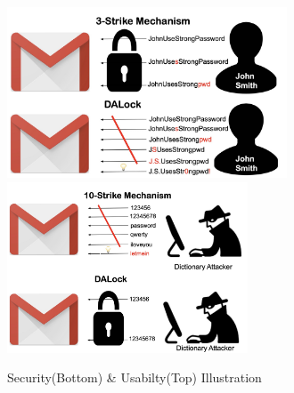 \vspace*{-\baselineskip}
\begin{figure}[htb]
	\begin{center}
		\includegraphics[height=2.0in,width=\linewidth]{Figures/Introduction/Usability.png}
		\includegraphics[height=2.0in,width=\linewidth]{Figures/Introduction/Security.png}	
\vspace*{-\baselineskip}
		\caption{Security(Bottom) \& Usabilty(Top) Illustration}\label{figure:introduction_security}
	\end{center}
\end{figure}
\vspace*{-\baselineskip}
\vspace*{-\baselineskip}


